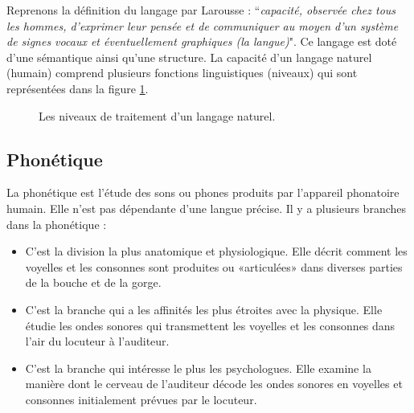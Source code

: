 \documentclass{KodeBook}
\begin{document}
Reprenons la définition du langage par Larousse : ``\textit{capacité, observée chez tous les hommes, d'exprimer leur pensée et de communiquer au moyen d'un système de signes vocaux et éventuellement graphiques (la langue)}".
Ce langage est doté d'une sémantique ainsi qu'une structure. 
La capacité d'un langage naturel (humain) comprend plusieurs fonctions linguistiques (niveaux) qui sont représentées dans la figure \ref{fig:niveaux}.

\begin{figure}[ht]
	\centering 
	\caption{Les niveaux de traitement d'un langage naturel. \label{fig:niveaux}}
\end{figure}

\subsection{Phonétique}

La phonétique est l'étude des sons ou phones produits par l'appareil phonatoire humain.
Elle n'est pas dépendante d'une langue précise. 
Il y a plusieurs branches dans la phonétique :
\begin{itemize}
	\item {}  C'est la division la plus anatomique et physiologique. 
	Elle décrit comment les voyelles et les consonnes sont produites ou «articulées» dans diverses parties de la bouche et de la gorge.
	\item {} C'est la branche qui a les affinités les plus étroites avec la physique. 
	Elle étudie les ondes sonores qui transmettent les voyelles et les consonnes dans l'air du locuteur à l'auditeur.
	\item {} C'est la branche qui intéresse le plus les psychologues. 
	Elle examine la manière dont le cerveau de l'auditeur décode les ondes sonores en voyelles et consonnes initialement prévues par le locuteur.
\end{itemize}
\end{document}
